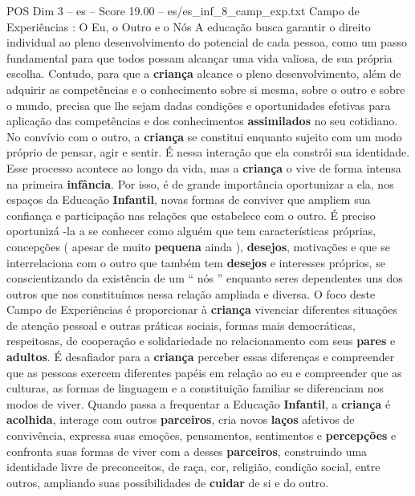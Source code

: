 \begin{textsample}{POS Dim 3 – es – Score 19.00 – es/es\_inf\_8\_camp\_exp.txt}  \label{ex:f3_pos_119}
Campo de Experiências : O Eu, o Outro e o Nós A educação busca garantir o direito individual ao pleno desenvolvimento do potencial de cada pessoa, como um passo fundamental para que todos possam alcançar uma vida valiosa, de sua própria escolha.
Contudo, para que a \textbf{criança} alcance o pleno desenvolvimento, além de adquirir as competências e o conhecimento sobre si mesma, sobre o outro e sobre o mundo, precisa que lhe sejam dadas condições e oportunidades efetivas para aplicação das competências e dos conhecimentos \textbf{assimilados} no seu cotidiano.
No convívio com o outro, a \textbf{criança} se constitui enquanto sujeito com um modo próprio de pensar, agir e sentir.
É nessa interação que ela constrói sua identidade.
Esse processo acontece ao longo da vida, mas a \textbf{criança} o vive de forma intensa na primeira \textbf{infância}.
Por isso, é de grande importância oportunizar a ela, nos espaços da Educação \textbf{Infantil}, novas formas de conviver que ampliem sua confiança e participação nas relações que estabelece com o outro.
É preciso oportunizá -la a se conhecer como alguém que tem características próprias, concepções ( apesar de muito \textbf{pequena} ainda ), \textbf{desejos}, motivações e que se interrelaciona com o outro que também tem \textbf{desejos} e interesses próprios, se conscientizando da existência de um “ nós ” enquanto seres dependentes uns dos outros que nos constituímos nessa relação ampliada e diversa.
O foco deste Campo de Experiências é proporcionar à \textbf{criança} vivenciar diferentes situações de atenção pessoal e outras práticas sociais, formas mais democráticas, respeitosas, de cooperação e solidariedade no relacionamento com seus \textbf{pares} e \textbf{adultos}.
É desafiador para a \textbf{criança} perceber essas diferenças e compreender que as pessoas exercem diferentes papéis em relação ao eu e compreender que as culturas, as formas de linguagem e a constituição familiar se diferenciam nos modos de viver.
Quando passa a frequentar a Educação \textbf{Infantil}, a \textbf{criança} é \textbf{acolhida}, interage com outros \textbf{parceiros}, cria novos \textbf{laços} afetivos de convivência, expressa suas emoções, pensamentos, sentimentos e \textbf{percepções} e confronta suas formas de viver com a desses \textbf{parceiros}, construindo uma identidade livre de preconceitos, de raça, cor, religião, condição social, entre outros, ampliando suas possibilidades de \textbf{cuidar} de si e do outro.

\end{textsample}
